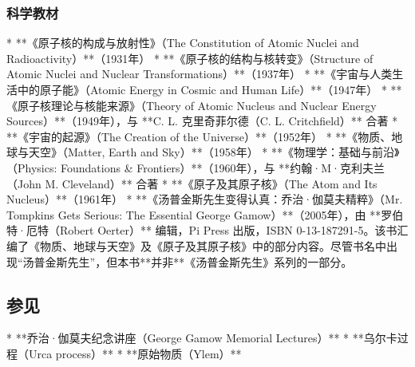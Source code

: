 \subsubsection{科学教材}

* **《原子核的构成与放射性》（The Constitution of Atomic Nuclei and Radioactivity）**（1931年）
* **《原子核的结构与核转变》（Structure of Atomic Nuclei and Nuclear Transformations）**（1937年）
* **《宇宙与人类生活中的原子能》（Atomic Energy in Cosmic and Human Life）**（1947年）
* **《原子核理论与核能来源》（Theory of Atomic Nucleus and Nuclear Energy Sources）**（1949年），与 **C. L. 克里奇菲尔德（C. L. Critchfield）** 合著
* **《宇宙的起源》（The Creation of the Universe）**（1952年）
* **《物质、地球与天空》（Matter, Earth and Sky）**（1958年）
* **《物理学：基础与前沿》（Physics: Foundations & Frontiers）**（1960年），与 **约翰·M·克利夫兰（John M. Cleveland）** 合著
* **《原子及其原子核》（The Atom and Its Nucleus）**（1961年）
* **《汤普金斯先生变得认真：乔治·伽莫夫精粹》（Mr. Tompkins Gets Serious: The Essential George Gamow）**（2005年），由 **罗伯特·厄特（Robert Oerter）** 编辑，Pi Press 出版，ISBN 0-13-187291-5。该书汇编了《物质、地球与天空》及《原子及其原子核》中的部分内容。尽管书名中出现“汤普金斯先生”，但本书**并非**《汤普金斯先生》系列的一部分。
\subsection{参见}

* **乔治·伽莫夫纪念讲座（George Gamow Memorial Lectures）**
* **乌尔卡过程（Urca process）**
* **原始物质（Ylem）**

